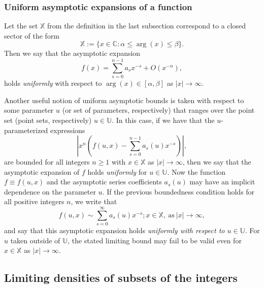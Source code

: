 \documentclass[11pt,reqno,a4letter]{article}
\numberwithin{figure}{section}
\numberwithin{table}{section}
\theoremstyle{plain}
\numberwithin{theorem}{section}
\theoremstyle{definition}
\begin{document}
\subsubsection{Uniform asymptotic expansions of a function} 

Let the set $\mathbb{X}$ from the definition in the last subsection correspond to a 
closed sector of the form 
$$\mathbb{X} := \{x \in \mathbb{C}: \alpha \leq \operatorname{arg}(x) \leq \beta\}.$$ 
Then we say that the asymptotic expansion 
\[
f(x) = \sum_{s=0}^{n-1} a_s x^{-s} + O(x^{-n}), 
\]
holds \emph{uniformly} with respect to $\operatorname{arg}(x) \in [\alpha, \beta]$ as 
$|x| \rightarrow \infty$. 

Another useful notion of uniform asymptotic bounds is taken with respect to some parameter $u$ 
(or set of parameters, respectively) that ranges over the point set (point sets, respectively) 
$u \in \mathbb{U}$. In this case, if we have that the $u$-parameterized expressions 
\[
\left\lvert x^n\left(f(u, x) - \sum_{s=0}^{n-1} a_s(u) x^{-s}\right) \right\rvert, 
\]
are bounded for all integers $n \geq 1$ with $x \in \mathbb{X}$ as 
$|x| \rightarrow \infty$, then we say that 
the asymptotic expansion of $f$ holds \emph{uniformly} for $u \in \mathbb{U}$. 
Now the function $f \equiv f(u, x)$ and the 
asymptotic series coefficients $a_s(u)$ may have an implicit dependence on the parameter $u$. 
If the previous boundedness condition holds for all positive integers $n$, we write that 
\[
f(u, x) \sim \sum_{s=0}^{\infty} a_s(u) x^{-s}; x \in \mathbb{X}, \mathrm{\ as \ } |x| \rightarrow \infty, 
\]
and say that this asymptotic expansion holds \emph{uniformly with respect to $u \in \mathbb{U}$}. 
For $u$ taken outside of $\mathbb{U}$, the stated limiting 
bound may fail to be valid even for $x \in \mathbb{X}$ as 
$|x| \rightarrow \infty$. 

\subsection{Limiting densities of subsets of the integers} 
\end{document}
